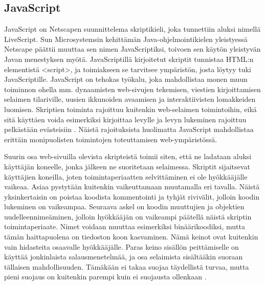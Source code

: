 \subsection{JavaScript}

JavaScript on Netscapen suunnittelema skriptikieli, joka tunnettiin aluksi nimellä LiveScript. Sun Microsystemsin kehittämän Java-ohjelmointikielen yleistyessä Netscape päättii muuttaa 
sen nimen JavaScriptiksi, toivoen sen käytön yleistyvän Javan menestyksen myötä. JavaScriptillä kirjoitetut skriptit tunnistaa HTML:n elementistä <script>, ja toimiakseen se tarvitsee ympäristön,
josta löytyy tuki JavaScriptille. JavaScript on tehokas työkalu, joka  mahdollistaa monen muun toiminnon ohella mm. dynaamisten web-sivujen tekemisen, viestien kirjoittamisen selaimen 
tilariville, uusien ikkunoiden avaamisen ja interaktiivisten lomakkeiden luomisen. Skriptien toiminta rajoittuu kuitenkin web-selaimen toimintoihin, eikä sitä käyttäen voida esimerkiksi 
kirjoittaa levylle ja levyn lukeminen rajoittuu pelkästään evästeisiin \cite{JavaScript}. Näistä rajoituksista huolimatta JavaScript mahdollistaa erittäin monipuolisten toimintojen 
toteuttamisen web-ympäristössä.

Suurin osa web-sivuilla olevista skripteistä toimii siten, että ne ladataan aluksi käyttäjän koneelle, jonka jälkeen ne suoritetaan selaimessa. Skriptit sijaitsevat käyttäjien 
koneilla, joten toimintaperiaatten selvittäminen ei ole hyökkääjälle vaikeaa. Asiaa pystytään kuitenkin vaikeuttamaan muutamalla eri tavalla. Näistä yksinkertaisin on poistaa koodista
kommentointi ja tyhjät rivivälit, jolloin koodin lukeminen on vaikeampaa. Seuraava askel on koodin muuttujien ja objektien uudelleennimeäminen, jolloin hyökkääjän on vaikeampi päätellä näistä
skriptin toimintaperiaate. Nimet voidaan muuttaa esimerkiksi binäärikoodiksi, mutta tämän haittapuolena on tiedoston koon kasvaminen. Nämä keinot ovat kuitenkin vain hidasteita osaavalle 
hyökkääjälle. Paras keino sisällön peittämiselle on käyttää jonkinlaista salausmenetelmää, ja osa selaimista sisältääkin suoraan tällaisen mahdollisuuden. Tämäkään ei takaa suojaa täydellistä
turvaa, mutta pieni suojaus on kuitenkin parempi kuin ei suojausta ollenkaan \cite{AJAX}.

